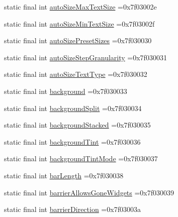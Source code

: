 \begin{DoxyCompactItemize}
\item 
static final int \mbox{\hyperlink{classcom_1_1example_1_1trainawearapplication_1_1_r_1_1attr_ad49137810b63d6bc3fc64e9936858323}{auto\+Size\+Max\+Text\+Size}} =0x7f03002e
\item 
static final int \mbox{\hyperlink{classcom_1_1example_1_1trainawearapplication_1_1_r_1_1attr_ac84090fd3636d659f5b4cd2a36467370}{auto\+Size\+Min\+Text\+Size}} =0x7f03002f
\item 
static final int \mbox{\hyperlink{classcom_1_1example_1_1trainawearapplication_1_1_r_1_1attr_a6e119c39697ac3179214fbf41f0ee076}{auto\+Size\+Preset\+Sizes}} =0x7f030030
\item 
static final int \mbox{\hyperlink{classcom_1_1example_1_1trainawearapplication_1_1_r_1_1attr_a671d60e3fdae4d16132de51b223a35b5}{auto\+Size\+Step\+Granularity}} =0x7f030031
\item 
static final int \mbox{\hyperlink{classcom_1_1example_1_1trainawearapplication_1_1_r_1_1attr_aee41c5e05b311b60f98178fbaf08b826}{auto\+Size\+Text\+Type}} =0x7f030032
\item 
static final int \mbox{\hyperlink{classcom_1_1example_1_1trainawearapplication_1_1_r_1_1attr_a49d074bb5ec9d806bb7a8bcacaab7814}{background}} =0x7f030033
\item 
static final int \mbox{\hyperlink{classcom_1_1example_1_1trainawearapplication_1_1_r_1_1attr_ace96dea1dd5a76c0d3854a09870e0607}{background\+Split}} =0x7f030034
\item 
static final int \mbox{\hyperlink{classcom_1_1example_1_1trainawearapplication_1_1_r_1_1attr_aedddf993f798dad106bc308957d0f721}{background\+Stacked}} =0x7f030035
\item 
static final int \mbox{\hyperlink{classcom_1_1example_1_1trainawearapplication_1_1_r_1_1attr_a37db0456271aa1e6054982cb37c1363c}{background\+Tint}} =0x7f030036
\item 
static final int \mbox{\hyperlink{classcom_1_1example_1_1trainawearapplication_1_1_r_1_1attr_af9080ed83e546dba106d8d68f864259b}{background\+Tint\+Mode}} =0x7f030037
\item 
static final int \mbox{\hyperlink{classcom_1_1example_1_1trainawearapplication_1_1_r_1_1attr_acbe79b46a302d767a7c11f255394de59}{bar\+Length}} =0x7f030038
\item 
static final int \mbox{\hyperlink{classcom_1_1example_1_1trainawearapplication_1_1_r_1_1attr_ae34e7c2497c02484571374930679ff8e}{barrier\+Allows\+Gone\+Widgets}} =0x7f030039
\item 
static final int \mbox{\hyperlink{classcom_1_1example_1_1trainawearapplication_1_1_r_1_1attr_ad008a1714b35b56003c259965cbfb6a7}{barrier\+Direction}} =0x7f03003a

\end{DoxyCompactItemize}
